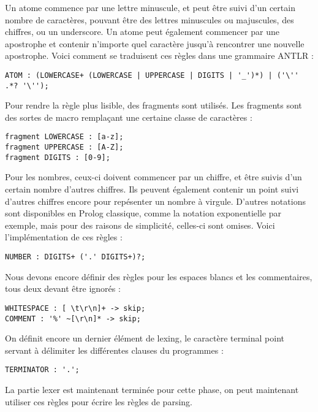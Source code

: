 \documentclass[../report.tex]{subfiles}
\begin{document}
Un atome commence par une lettre minuscule, et peut être suivi d'un certain nombre de caractères, pouvant être des lettres minuscules ou majuscules, des chiffres, ou un underscore. Un atome peut également commencer par une apostrophe et contenir n'importe quel caractère jusqu'à rencontrer une nouvelle apostrophe. Voici comment se traduisent ces règles dans une grammaire ANTLR :
\begin{verbatim}
ATOM : (LOWERCASE+ (LOWERCASE | UPPERCASE | DIGITS | '_')*) | ('\'' .*? '\'');
\end{verbatim}
Pour rendre la règle plus lisible, des fragments sont utilisés. Les fragments sont des sortes de macro remplaçant une certaine classe de caractères :
\begin{verbatim}
fragment LOWERCASE : [a-z];
fragment UPPERCASE : [A-Z];
fragment DIGITS : [0-9];    
\end{verbatim}
Pour les nombres, ceux-ci doivent commencer par un chiffre, et être suivis d'un certain nombre d'autres chiffres. Ils peuvent également contenir un point suivi d'autres chiffres encore pour repésenter un nombre à virgule. D'autres notations sont disponibles en Prolog classique, comme la notation exponentielle par exemple, mais pour des raisons de simplicité, celles-ci sont omises. Voici l'implémentation de ces règles :
\begin{verbatim}
NUMBER : DIGITS+ ('.' DIGITS+)?;
\end{verbatim}
Nous devons encore définir des règles pour les espaces blancs et les commentaires, tous deux devant être ignorés :
\begin{verbatim}
WHITESPACE : [ \t\r\n]+ -> skip;
COMMENT : '%' ~[\r\n]* -> skip;    
\end{verbatim}
On définit encore un dernier élément de lexing, le caractère terminal point servant à délimiter les différentes clauses du programmes :
\begin{verbatim}
TERMINATOR : '.';
\end{verbatim}
La partie lexer est maintenant terminée pour cette phase, on peut maintenant utiliser ces règles pour écrire les règles de parsing.
\end{document}
